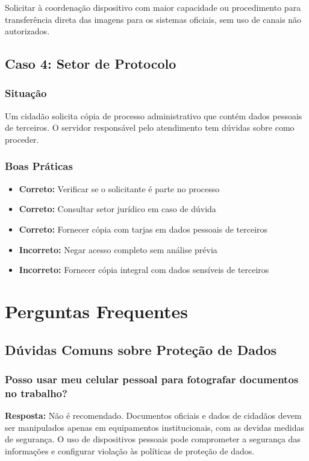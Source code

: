\documentclass[12pt,a4paper]{article}
\begin{document}
\begin{tcolorbox}[colback=verdeclaro, colframe=green!75!black, title=Solução Adequada]
Solicitar à coordenação dispositivo com maior capacidade ou procedimento para transferência direta das imagens para os sistemas oficiais, sem uso de canais não autorizados.
\end{tcolorbox}

\subsection{Caso 4: Setor de Protocolo}

\subsubsection{Situação}
Um cidadão solicita cópia de processo administrativo que contém dados pessoais de terceiros. O servidor responsável pelo atendimento tem dúvidas sobre como proceder.

\subsubsection{Boas Práticas}
\begin{itemize}
    \item \textbf{Correto:} Verificar se o solicitante é parte no processo
    \item \textbf{Correto:} Consultar setor jurídico em caso de dúvida
    \item \textbf{Correto:} Fornecer cópia com tarjas em dados pessoais de terceiros
    \item \textbf{Incorreto:} Negar acesso completo sem análise prévia
    \item \textbf{Incorreto:} Fornecer cópia integral com dados sensíveis de terceiros
\end{itemize}

\newpage
\section{Perguntas Frequentes}

\subsection{Dúvidas Comuns sobre Proteção de Dados}

\subsubsection{Posso usar meu celular pessoal para fotografar documentos no trabalho?}
\textbf{Resposta:} Não é recomendado. Documentos oficiais e dados de cidadãos devem ser manipulados apenas em equipamentos institucionais, com as devidas medidas de segurança. O uso de dispositivos pessoais pode comprometer a segurança das informações e configurar violação às políticas de proteção de dados.
\end{document}
